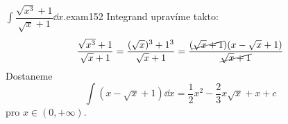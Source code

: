 \begin{mathexam}{\(\int\dfrac{\sqrt{x^3}+1}{\sqrt{x}+1}\dd{x}.\)}{exam152} 
  Integrand upravíme takto: 
  \begin{equation*}
    \dfrac{\sqrt{x^3}+1}{\sqrt{x}+1} = \dfrac{(\sqrt{x})^3+1^3}{\sqrt{x}+1}
      = \dfrac{(\cancel{\sqrt{x} + 1})(x-\sqrt{x}+1)}{\cancel{\sqrt{x}+1}}
  \end{equation*}
  Dostaneme
  \[\int(x-\sqrt{x}+1)\dd{x} = \dfrac{1}{2}x^2 - \dfrac{2}{3}x\sqrt{x} + x +c\] pro
  \(x\in(0,+\infty)\). 
\end{mathexam}
